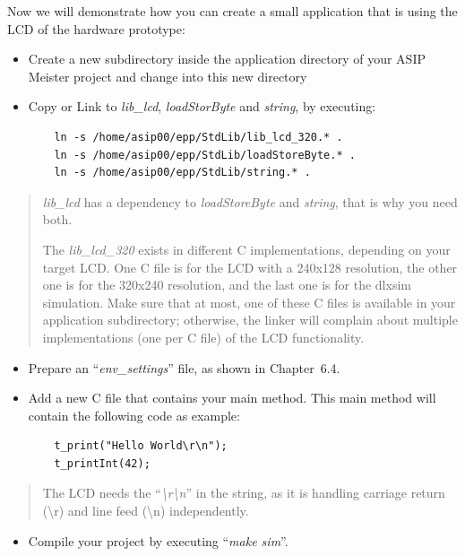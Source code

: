 Now we will demonstrate how you can create a small application that is
using the LCD of the hardware prototype:
\begin{itemize}
\item
  Create a new subdirectory inside the application directory of your
  ASIP Meister project and change into this new directory
\item
  Copy or Link to \emph{lib\_lcd}, \emph{loadStorByte} and
  \emph{string}, by executing:
\begin{lstlisting}
	ln -s /home/asip00/epp/StdLib/lib_lcd_320.* .
	ln -s /home/asip00/epp/StdLib/loadStoreByte.* .
	ln -s /home/asip00/epp/StdLib/string.* .	
\end{lstlisting}
\end{itemize}
\begin{quote}
\emph{lib\_lcd} has a dependency to \emph{loadStoreByte} and
\emph{string}, that is why you need both.

The \emph{lib\_lcd\_320} exists in different C implementations,
depending on your target LCD. One C file is for the LCD with a 240x128
resolution, the other one is for the 320x240 resolution, and the last
one is for the dlxsim simulation. Make sure that at most, one of these C
files is available in your application subdirectory; otherwise, the
linker will complain about multiple implementations (one per C file) of
the LCD functionality.
\end{quote}

\begin{itemize}
\item
  Prepare an ``\emph{env\_settings}'' file, as shown in Chapter~6.4.
\item
  Add a new C file that contains your main method. This main method will
  contain the following code as example:
  \begin{lstlisting}
 	t_print("Hello World\r\n");
 	t_printInt(42);
  \end{lstlisting}
\end{itemize}
\begin{quote}
The LCD needs the ``\emph{\textbackslash r\textbackslash n}'' in the
string, as it is handling carriage return (\textbackslash r) and line
feed (\textbackslash n) independently.
\end{quote}

\begin{itemize}
\item
  Compile your project by executing ``\emph{make sim}''.
\end{itemize}


